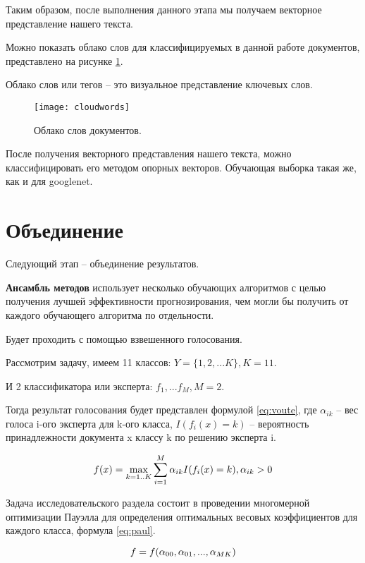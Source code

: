 Таким образом, после выполнения данного этапа мы получаем векторное представление нашего текста.

Можно показать облако слов для классифицируемых в данной работе документов, представлено на рисунке \ref{img:cloudwords}. 

Облако слов или тегов -- это визуальное представление ключевых слов. 

\begin{figure}[H]
	\centering
	\texttt{[image: cloudwords]}
	\caption{Облако слов документов. }
	\label{img:cloudwords}
\end{figure}

После получения векторного представления нашего текста, можно классифицировать его методом опорных векторов. Обучающая выборка такая же, как и для googlenet.

\section{Объединение}

Следующий этап -- объединение результатов.

\textbf{Ансамбль методов} использует несколько обучающих алгоритмов с целью получения лучшей эффективности прогнозирования, чем могли бы получить от каждого обучающего алгоритма по отдельности.

Будет проходить с помощью взвешенного голосования.

Рассмотрим задачу, имеем 11 классов: $Y=\{1,2,...K\}, K=11$.

И 2 классификатора или эксперта: $f_1, ...f_M, M=2$.

Тогда результат голосования будет представлен формулой \ref{eq:voute}, где $\alpha_{ik}$ -- вес голоса i-ого эксперта для k-ого класса, $I(f_i(x)=k)$ -- вероятность принадлежности документа x классу k по решению эксперта i.

\begin{equation}
	\centering
	f(x)=\max_{k=1..K}\sum_{i=1}^M\alpha_{ik} I(f_i(x)=k), \alpha_{ik}>0
	\label{eq:voute}
\end{equation}

Задача исследовательского раздела состоит в проведении многомерной оптимизации Пауэлла для определения оптимальных весовых коэффициентов для каждого класса, формула \ref{eq:paul}.

\begin{equation}
	\centering
	f=f(\alpha_{00}, \alpha_{01}, ..., \alpha_{MK})
	\label{eq:paul}
\end{equation}

